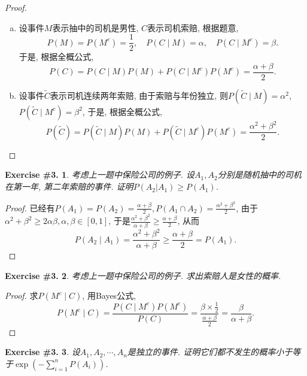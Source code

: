 \documentclass[UTF8, a4paper]{article}
\newtheorem{exercise}{Exercise \#3.}
\begin{document}
\begin{proof}
\begin{enumerate}[a)]
    \item 设事件\(M\)表示抽中的司机是男性, \(C\)表示司机索赔, 根据题意, 
    $$
    P(M) = P(M^c) = \frac{1}{2}, \quad P(C \mid M) = \alpha, \quad P(C \mid M^c) = \beta.
    $$
    于是, 根据全概公式, 
    $$
    P(C) = P(C \mid M)P(M) + P(C \mid M^c)P(M^c) = \frac{\alpha + \beta}{2}.
    $$
    \item 设事件\(\tilde{C}\)表示司机连续两年索赔, 由于索赔与年份独立, 则\(P(\tilde{C} \mid M) = \alpha^2\), \(P(\tilde{C} \mid M^c) = \beta^2\), 
    于是, 根据全概公式, 
    $$
    P(\tilde{C}) = P(\tilde{C} \mid M)P(M) + P(\tilde{C} \mid M^c)P(M^c) = \frac{\alpha^2 + \beta^2}{2}.
    $$
\end{enumerate}
\end{proof}


\begin{framed}
\begin{exercise}
考虑上一题中保险公司的例子. 设\(A_1, A_2\)分别是随机抽中的司机在第一年, 第二年索赔的事件. 证明\(P(A_2|A_1)\geq P(A_1)\).
\end{exercise}
\end{framed}

\begin{proof}
已经有\(P(A_1) = P(A_2) = \frac{\alpha +\beta}{2}, P(A_1 \cap A_2) = \frac{\alpha^2 + \beta^2}{2}\), 
由于\(\alpha^ 2 + \beta^2 \geq 2\alpha \beta, \alpha, \beta \in [0,1]\), 于是\( \frac{\alpha^2 + \beta^2}{\alpha + \beta} \geq \frac{\alpha + \beta}{2} \), 从而
$$
P(A_2 \mid A_1) = \frac{\alpha^2 + \beta^2}{\alpha + \beta} \geq \frac{\alpha + \beta}{2} = P(A_1).
$$
\end{proof}


\begin{framed}
\begin{exercise}
    考虑上一题中保险公司的例子. 求出索赔人是女性的概率.
\end{exercise}
\end{framed}

\begin{proof}
求\(P(M^c \mid C)\), 用Bayes公式, 
$$
P(M^c \mid C) = \frac{P(C\mid M^c)P(M^c)}{P(C)} = \frac{\beta \times \frac{1}{2}}{\frac{\alpha + \beta}{2}} = \frac{\beta}{\alpha + \beta}.
$$
\end{proof}



\begin{framed}
\begin{exercise}
    设\(A_1, A_2, \cdots, A_n\)是独立的事件. 证明它们都不发生的概率小于等于\(\exp\left(-\sum_{i=1}^n P(A_i)\right)\).
\end{exercise}
\end{framed}
\end{document}
